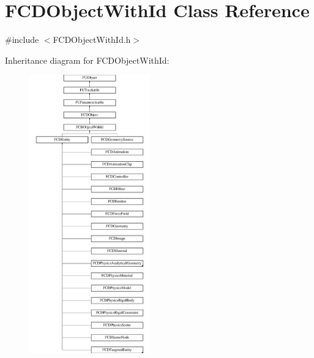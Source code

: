 \hypertarget{classFCDObjectWithId}{
\section{FCDObjectWithId Class Reference}
\label{classFCDObjectWithId}
}


{\ttfamily \#include $<$FCDObjectWithId.h$>$}

Inheritance diagram for FCDObjectWithId:\begin{figure}[H]
\begin{center}
\leavevmode
\includegraphics[height=12.000000cm]{classFCDObjectWithId}
\end{center}
\end{figure}
